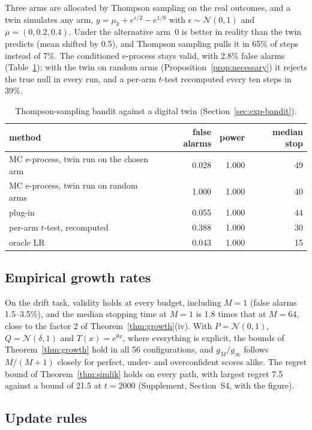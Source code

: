\documentclass[12pt]{article}
\theoremstyle{remark}
\def\spacingset#1{\renewcommand{\baselinestretch}%
{#1}\small\normalsize} \spacingset{1}
\begin{document}
Three arms are allocated by Thompson sampling on the real outcomes, and a twin
simulates any arm, $y = \mu_k + e^{\epsilon/2} - e^{1/8}$ with
$\epsilon \sim \mathcal N(0, 1)$ and $\mu = (0, 0.2, 0.4)$. Under the
alternative arm~0 is better in reality than the twin predicts (mean shifted by
0.5), and Thompson sampling pulls it in 65\% of steps instead of 7\%. The conditioned e-process stays valid, with 2.8\% false alarms (Table~\ref{tab:bandit}); with the twin on random arms (Proposition~\ref{prop:necessary}) it rejects the true null in every run, and a per-arm $t$-test recomputed every ten steps in 39\%.

\begin{table}[tp]
\spacingset{1}
\centering
\caption{Thompson-sampling bandit against a digital twin
(Section~\ref{sec:exp-bandit}).}
\label{tab:bandit}
\begin{tabular}{lrrr}
\toprule
method & false alarms & power & median stop \\
\midrule
MC e-process, twin run on the chosen arm & 0.028 & 1.000 & 49 \\
MC e-process, twin run on random arms & 1.000 & 1.000 & 40 \\
plug-in & 0.055 & 1.000 & 44 \\
per-arm $t$-test, recomputed & 0.388 & 1.000 & 30 \\
oracle LR & 0.043 & 1.000 & 15 \\
\bottomrule
\end{tabular}
\end{table}

\subsection{Empirical growth rates}\label{sec:exp-budget}

On the drift task, validity holds at every budget, including $M = 1$ (false
alarms 1.5--3.5\%), and the median stopping time at $M = 1$ is 1.8 times that
at $M = 64$, close to the factor 2 of Theorem~\ref{thm:growth}(iv). With
$P = \mathcal N(0,1)$, $Q = \mathcal N(\delta, 1)$ and $T(x) = e^{\theta x}$,
where everything is explicit, the bounds of Theorem~\ref{thm:growth} hold in
all 56 configurations, and $g_M/g_\infty$ follows $M/(M+1)$ closely for
perfect, under- and overconfident scores alike. The regret bound of
Theorem~\ref{thm:simlik} holds on every path, with largest regret 7.5 against
a bound of 21.5 at $t = 2000$ (Supplement, Section~S4, with the figure).

\subsection{Update rules}\label{sec:exp-blr}
\end{document}
